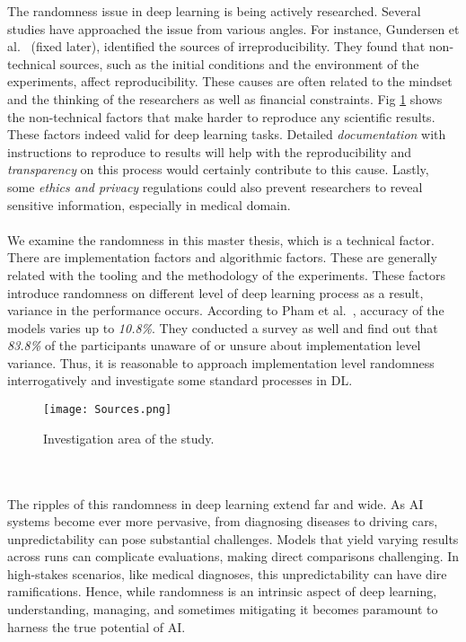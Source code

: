 The randomness issue in deep learning is being actively researched. 
Several studies have approached the issue from various angles. 
For instance, Gundersen et al.~\cite{gundersen2022sources} (fixed later), identified the sources of irreproducibility. 
They found that non-technical sources, such as the initial conditions and the environment of the experiments, affect reproducibility. 
These causes are often related to the mindset and the thinking of the researchers as well as financial constraints. Fig \ref{fig:sources} shows
the non-technical factors that make harder to reproduce any scientific results. These factors indeed valid for deep learning tasks.
Detailed \emph{documentation} with instructions to reproduce to results will help with the reproducibility
and \emph{transparency} on this process would certainly contribute to this cause. Lastly, some \emph{ethics and privacy} regulations could also prevent researchers
to reveal sensitive information, especially in medical domain.
\\
\\

We examine the randomness in this master thesis, which is a technical factor. There are implementation factors and algorithmic factors. These are generally
related with the tooling and the methodology of the experiments. These factors introduce randomness on different level of deep learning process
as a result, variance in the performance occurs. According to Pham et al.~\cite{pham2020problems}, accuracy of the models varies up to \emph{10.8\%}. They conducted a survey as well and
find out that \emph{83.8\%} of the participants unaware of or unsure about implementation level variance. 
Thus, it is reasonable to approach implementation level randomness interrogatively and investigate some standard processes in DL. 
\begin{figure}[htbp]
    \centerline{\texttt{[image: Sources.png]}}
    \caption{Investigation area of the study.}
    \label{fig:sources}
    \end{figure}
\\
\\
The ripples of this randomness in deep learning extend far and wide. As AI systems become ever more pervasive, from diagnosing diseases to driving cars, unpredictability can pose substantial challenges. Models that yield varying results across runs can complicate evaluations, making direct comparisons challenging. In high-stakes scenarios, like medical diagnoses, this unpredictability can have dire ramifications. Hence, while randomness is an intrinsic aspect of deep learning, understanding, managing, and sometimes mitigating it becomes paramount to harness the true potential of AI.\\
\\

